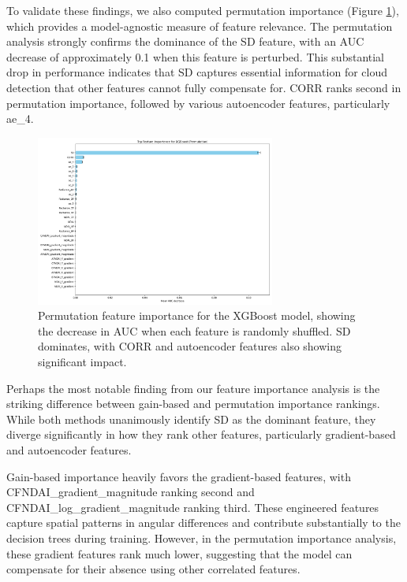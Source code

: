 \documentclass[10pt,letterpaper]{article}
\begin{document}
To validate these findings, we also computed permutation importance (Figure \ref{fig:permutation_importance}), which provides a model-agnostic measure of feature relevance. The permutation analysis strongly confirms the dominance of the SD feature, with an AUC decrease of approximately 0.1 when this feature is perturbed. This substantial drop in performance indicates that SD captures essential information for cloud detection that other features cannot fully compensate for. CORR ranks second in permutation importance, followed by various autoencoder features, particularly ae\_4.

\begin{figure}[h]
\centering
\includegraphics[width=0.7\textwidth]{xgboost_feature_importance.png}
\caption{Permutation feature importance for the XGBoost model, showing the decrease in AUC when each feature is randomly shuffled. SD dominates, with CORR and autoencoder features also showing significant impact.}
\label{fig:permutation_importance}
\end{figure}

Perhaps the most notable finding from our feature importance analysis is the striking difference between gain-based and permutation importance rankings. While both methods unanimously identify SD as the dominant feature, they diverge significantly in how they rank other features, particularly gradient-based and autoencoder features.

Gain-based importance heavily favors the gradient-based features, with CFNDAI\_gradient\_magnitude ranking second and CFNDAI\_log\_gradient\_magnitude ranking third. These engineered features capture spatial patterns in angular differences and contribute substantially to the decision trees during training. However, in the permutation importance analysis, these gradient features rank much lower, suggesting that the model can compensate for their absence using other correlated features.
\end{document}
